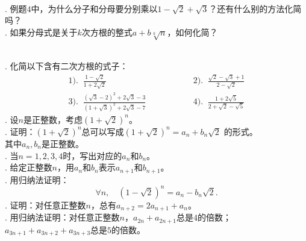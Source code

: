 \documentclass[12pt,UTF8]{ctexbook}
\begin{document}
\begin{sk}
    \mbox{} \\
    . 例题$4$中，为什么分子和分母要分别乘以$1 - \sqrt{2} + \sqrt{3}$？还有什么别的方法化简吗？\\
    . 如果分母式是关于$k$次方根的整式$a + b\sqrt[k]{n}$，如何化简？
\end{sk}

\begin{xt}
    \mbox{} \\
    . 化简以下含有二次方根的式子：\\
    $$
    \begin{array}{lll}
       1).\;\; \displaystyle \frac{1 - \sqrt{2}}{1 + 2\sqrt{2}} &  \phantom{00000000} & 2).\;\; \displaystyle \frac{\sqrt{2} - \sqrt{3} + 1}{2 - \sqrt{2}} \\[2em]
       3).\;\; \displaystyle \frac{(\sqrt{3} - 2)^2 + 2\sqrt{3} - 3}{(1 + \sqrt{3})^2 + 2\sqrt{3} - 7} &  \phantom{00000000} & 4).\;\; \displaystyle \frac{1 + 2\sqrt{5}}{2 + \sqrt{2} - \sqrt{5}}
    \end{array}
    $$
    . 设$n$是正整数，考虑$(1 + \sqrt{2})^n$。\\
    . 证明：$(1 + \sqrt{2})^n$总可以写成$(1 + \sqrt{2})^n = a_n + b_n \sqrt{2}$
    的形式。\\
    \indent \phantom{2.1.} 其中$a_n, b_n$是正整数。\\
    . 当$n=1,2,3,4$时，写出对应的$a_n$和$b_n$。\\
    . 给定正整数$n$，用$a_n$和$b_n$表示$a_{n+1}$和$b_{n+1}$。\\
    . 用归纳法证明：
    $$\forall n, \quad (1 - \sqrt{2})^n = a_n - b_n \sqrt{2}.$$ 
    . 证明：对任意正整数$n$，总有$a_{n+2} = 2a_{n+1} + a_n$。\\
    . 用归纳法证明：对任意正整数$n$，$a_{2n} + a_{2n+1}$总是$4$的倍数；\\
    \indent \phantom{2.1.} $a_{3n+1} + a_{3n+2} + a_{3n+3}$总是$5$的倍数。

\end{xt}
\end{document}
